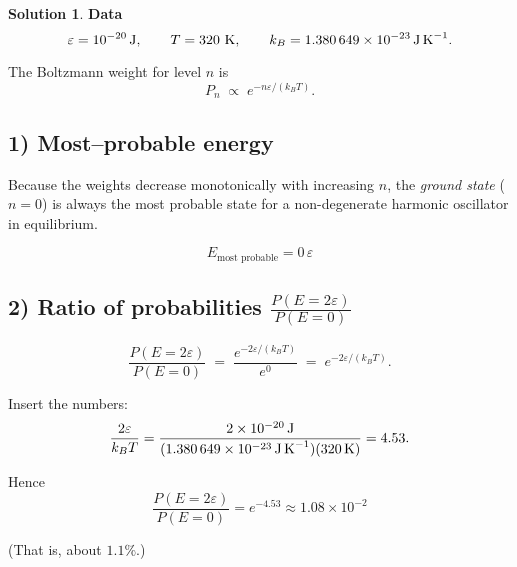 \documentclass[12pt]{article}
\theoremstyle{definition} %
\newtheorem{solution}{Solution}
\theoremstyle{plain} %
\begin{document}
      \begin{solution}
        \textbf{Data}  
        \[
        \varepsilon = 10^{-20}\,\text{J}, 
        \qquad 
        T = 320\ \text{K}, 
        \qquad 
        k_B = 1.380\,649\times10^{-23}\,\text{J\,K}^{-1}.
        \]
        
        The Boltzmann weight for level \(n\) is 
        \[
        P_n \;\propto\; e^{-n\varepsilon/(k_B T)} .
        \]
        
        \subsection*{1) Most–probable energy}
        
        Because the weights decrease monotonically with increasing \(n\),
        the \emph{ground state} (\(n=0\)) is always the most probable state
        for a non-degenerate harmonic oscillator in equilibrium.
        
        \[
        \boxed{\; E_{\text{most probable}} = 0\,\varepsilon \;}
        \]
        
        \subsection*{2) Ratio of probabilities \(\displaystyle \frac{P(E=2\varepsilon)}{P(E=0)}\)}
        
        \[
        \frac{P(E=2\varepsilon)}{P(E=0)}
           \;=\; \frac{e^{-2\varepsilon/(k_B T)}}{e^{0}}
           \;=\; e^{-2\varepsilon/(k_B T)} .
        \]
        
        Insert the numbers:
        \[
        \frac{2\varepsilon}{k_B T}
           = \frac{2\times10^{-20}\,\text{J}}
                  {(1.380\,649\times10^{-23}\,\text{J\,K}^{-1})(320\,\text{K})}
           = 4.53 .
        \]
        
        Hence
        \[
        \boxed{\;
        \frac{P(E=2\varepsilon)}{P(E=0)}
          = e^{-4.53}
          \approx 1.08\times10^{-2}
        \;}
        \]
        
        (That is, about \(1.1\%\).)
        \end{solution}
\end{document}
